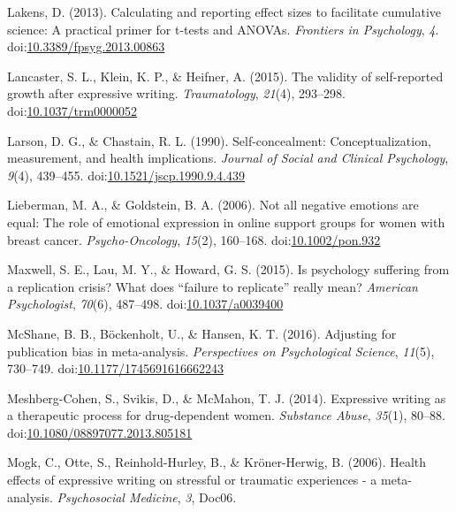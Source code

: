 \documentclass[english,man, mask]{apa6}
\theoremstyle{definition}
\theoremstyle{definition}
\theoremstyle{definition}
\theoremstyle{remark}
\begin{document}
\hypertarget{ref-Lakens2013}{}
Lakens, D. (2013). Calculating and reporting effect sizes to facilitate
cumulative science: A practical primer for t-tests and ANOVAs.
\emph{Frontiers in Psychology}, \emph{4}.
doi:\href{https://doi.org/10.3389/fpsyg.2013.00863}{10.3389/fpsyg.2013.00863}

\hypertarget{ref-Lancaster2015}{}
Lancaster, S. L., Klein, K. P., \& Heifner, A. (2015). The validity of
self-reported growth after expressive writing. \emph{Traumatology},
\emph{21}(4), 293--298.
doi:\href{https://doi.org/10.1037/trm0000052}{10.1037/trm0000052}

\hypertarget{ref-Larson1990a}{}
Larson, D. G., \& Chastain, R. L. (1990). Self-concealment:
Conceptualization, measurement, and health implications. \emph{Journal
of Social and Clinical Psychology}, \emph{9}(4), 439--455.
doi:\href{https://doi.org/10.1521/jscp.1990.9.4.439}{10.1521/jscp.1990.9.4.439}

\hypertarget{ref-Lieberman2006}{}
Lieberman, M. A., \& Goldstein, B. A. (2006). Not all negative emotions
are equal: The role of emotional expression in online support groups for
women with breast cancer. \emph{Psycho-Oncology}, \emph{15}(2),
160--168. doi:\href{https://doi.org/10.1002/pon.932}{10.1002/pon.932}

\hypertarget{ref-Maxwell2015}{}
Maxwell, S. E., Lau, M. Y., \& Howard, G. S. (2015). Is psychology
suffering from a replication crisis? What does ``failure to replicate''
really mean? \emph{American Psychologist}, \emph{70}(6), 487--498.
doi:\href{https://doi.org/10.1037/a0039400}{10.1037/a0039400}

\hypertarget{ref-McShane2016}{}
McShane, B. B., Böckenholt, U., \& Hansen, K. T. (2016). Adjusting for
publication bias in meta-analysis. \emph{Perspectives on Psychological
Science}, \emph{11}(5), 730--749.
doi:\href{https://doi.org/10.1177/1745691616662243}{10.1177/1745691616662243}

\hypertarget{ref-Meshberg-Cohen2014}{}
Meshberg-Cohen, S., Svikis, D., \& McMahon, T. J. (2014). Expressive
writing as a therapeutic process for drug-dependent women.
\emph{Substance Abuse}, \emph{35}(1), 80--88.
doi:\href{https://doi.org/10.1080/08897077.2013.805181}{10.1080/08897077.2013.805181}

\hypertarget{ref-Mogk2006}{}
Mogk, C., Otte, S., Reinhold-Hurley, B., \& Kröner-Herwig, B. (2006).
Health effects of expressive writing on stressful or traumatic
experiences - a meta-analysis. \emph{Psychosocial Medicine}, \emph{3},
Doc06.
\end{document}
